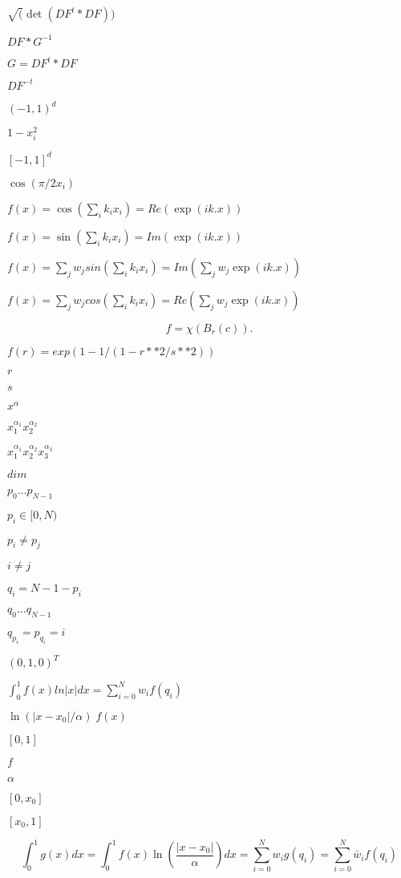 \documentclass{article}
\begin{document}
$\sqrt(\det(DF^{t} * DF))$
\pagebreak

$DF*G^{-1}$
\pagebreak

$G = DF^{t}*DF$
\pagebreak

$DF^{-t}$
\pagebreak

$(-1,1)^d$
\pagebreak

$1-x_i^2$
\pagebreak

$[-1,1]^d$
\pagebreak

$\cos(\pi/2 x_i)$
\pagebreak

$f(x) = \cos(\sum_i k_i x_i) = Re(\exp(i k.x))$
\pagebreak

$f(x) = \sin(\sum_i k_i x_i) = Im(\exp(i k.x))$
\pagebreak

$f(x) = \sum_j w_j sin(\sum_i k_i x_i) = Im(\sum_j w_j \exp(i k.x))$
\pagebreak

$f(x) = \sum_j w_j cos(\sum_i k_i x_i) = Re(\sum_j w_j \exp(i k.x))$
\pagebreak

\[ f = \chi(B_r(c)). \]
\pagebreak

$f(r)=exp(1-1/(1-r**2/s**2))$
\pagebreak

$r$
\pagebreak

$s$
\pagebreak

$x^\alpha$
\pagebreak

$x_1^{\alpha_1}x_2^{\alpha_2}$
\pagebreak

$x_1^{\alpha_1}x_2^{\alpha_2}x_3^{\alpha_3}$
\pagebreak

$dim$
\pagebreak

$p_0\ldots p_{N-1}$
\pagebreak

$p_i\in [0,N)$
\pagebreak

$p_i\neq p_j$
\pagebreak

$i\neq j$
\pagebreak

$q_i=N-1-p_i$
\pagebreak

$q_0\ldots q_{N-1}$
\pagebreak

$q_{p_i}=p_{q_i}=i$
\pagebreak

$(0, 1, 0)^T$
\pagebreak

$\int_0^1 f(x) ln|x| dx = \sum_{i=0}^N w_i f(q_i)$
\pagebreak

$\ln(|x-x_0|/\alpha)\;f(x)$
\pagebreak

$[0,1]$
\pagebreak

$f$
\pagebreak

$\alpha$
\pagebreak

$[0,x_0]$
\pagebreak

$[x_0,1]$
\pagebreak

\[ \int_0^1 g(x) dx = \int_0^1 f(x) \ln\left(\frac{|x-x_0|}{\alpha}\right) dx = \sum_{i=0}^N w_i g(q_i) = \sum_{i=0}^N \bar{w}_i f(q_i) \]
\pagebreak
\end{document}
